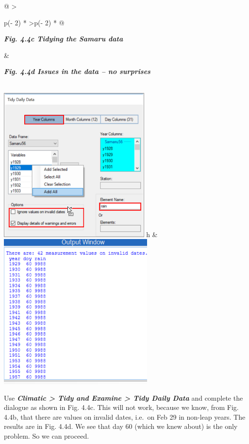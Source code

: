 \documentclass[
  letterpaper,
  DIV=11,
  numbers=noendperiod]{scrreprt}
\begin{document}
\begin{longtable}[]{@{}
  >{\raggedright\arraybackslash}p{(\columnwidth - 2\tabcolsep) * }
  >{\raggedleft\arraybackslash}p{(\columnwidth - 2\tabcolsep) * }@{}}
\toprule\noalign{}
\begin{minipage}[b]{\linewidth}\raggedright
\textbf{\emph{Fig. 4.4c Tidying the Samaru data}}
\end{minipage} & \begin{minipage}[b]{\linewidth}\raggedleft
\textbf{\emph{Fig. 4.4d Issues in the data -- no surprises}}
\end{minipage} \\
\midrule\noalign{}
\endhead
\bottomrule\noalign{}
\endlastfoot
\includegraphics[width=3.00521in,height=\textheight]{figures/Fig4.4c.png}
h &
\includegraphics[width=3.07685in,height=\textheight]{figures/Fig4.4d.png} \\
\end{longtable}

Use \textbf{\emph{Climatic \textgreater{} Tidy and Examine
\textgreater{} Tidy Daily Data}} and complete the dialogue as shown in
Fig. 4.4c. This will not work, because we know, from Fig. 4.4b, that
there are values on invalid dates, i.e.~on Feb 29 in non-leap years. The
results are in Fig. 4.4d. We see that day 60 (which we knew about) is
the only problem. So we can proceed.
\end{document}
